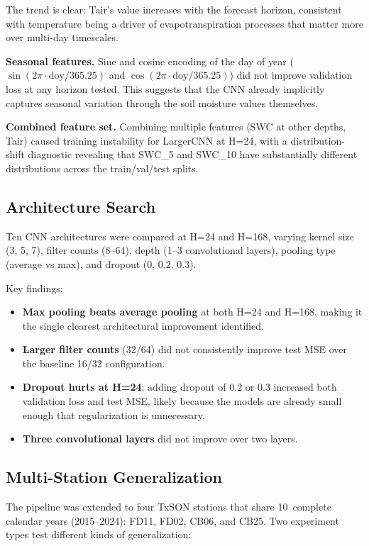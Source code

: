 \documentclass[11pt]{article}
\begin{document}
The trend is clear: Tair's value increases with the forecast horizon, consistent with
temperature being a driver of evapotranspiration processes that matter more over
multi-day timescales.

\textbf{Seasonal features.} Sine and cosine encoding of the day of year
($\sin(2\pi \cdot \text{doy}/365.25)$ and $\cos(2\pi \cdot \text{doy}/365.25)$) did
not improve validation loss at any horizon tested. This suggests that the CNN already
implicitly captures seasonal variation through the soil moisture values themselves.

\textbf{Combined feature set.} Combining multiple features (SWC at other depths,
Tair) caused training instability for LargerCNN at H=24, with a distribution-shift
diagnostic revealing that SWC\_5 and SWC\_10 have substantially different
distributions across the train/val/test splits.

\subsection{Architecture Search}

Ten CNN architectures were compared at H=24 and H=168, varying kernel size (3, 5, 7),
filter counts (8--64), depth (1--3 convolutional layers), pooling type (average vs
max), and dropout (0, 0.2, 0.3).

Key findings:
\begin{itemize}
    \item \textbf{Max pooling beats average pooling} at both H=24 and H=168, making
    it the single clearest architectural improvement identified.
    \item \textbf{Larger filter counts} (32/64) did not consistently improve test MSE
    over the baseline 16/32 configuration.
    \item \textbf{Dropout hurts at H=24}: adding dropout of 0.2 or 0.3 increased both
    validation loss and test MSE, likely because the models are already small enough
    that regularization is unnecessary.
    \item \textbf{Three convolutional layers} did not improve over two layers.
\end{itemize}

\subsection{Multi-Station Generalization}

The pipeline was extended to four TxSON stations that share 10~complete calendar years
(2015--2024): FD11, FD02, CB06, and CB25. Two experiment types test different kinds
of generalization:
\end{document}
